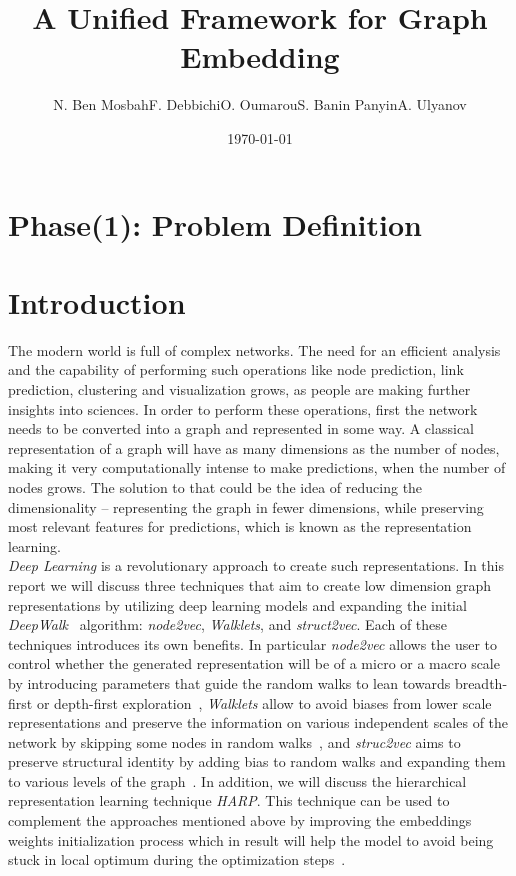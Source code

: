 \documentclass[a4paper,13pt]{article}
\title{A Unified Framework for Graph Embedding}
\author{N. Ben Mosbah\quad F. Debbichi\quad O. Oumarou\quad S. Banin Panyin\quad A. Ulyanov}
\date{\today}
\begin{document}
\maketitle
\section*{Phase(1): Problem Definition}

\section{Introduction}
The modern world is full of complex networks. The need for an efficient analysis and the capability of performing such operations like node prediction, link prediction, clustering and visualization grows, as people are making further insights into sciences. In order to perform these operations, first the network needs to be converted into a graph and represented in some way. A classical representation of a graph will have as many dimensions as the number of nodes, making it very computationally intense to make predictions, when the number of nodes grows. The solution to that could be the idea of reducing the dimensionality – representing the graph in fewer dimensions, while preserving most relevant features for predictions, which is known as the representation learning.\\
\textit{Deep Learning} is a revolutionary approach to create such representations. In this report we will discuss three techniques that aim to create low dimension graph representations by utilizing deep learning models and expanding the initial \textit{DeepWalk}~\cite{deepwalk} algorithm: \textit{node2vec}, \textit{Walklets}, and \textit{struct2vec}. Each of these techniques introduces its own benefits. In particular \textit{node2vec} allows the user to control whether the generated representation will be of a micro or a macro scale by introducing parameters that guide the random walks to lean towards breadth-first or depth-first exploration~\cite{node2vec}, \textit{Walklets} allow to avoid biases from lower scale representations and preserve the information on various independent scales of the network by skipping some nodes in random walks~\cite{walklets}, and \textit{struc2vec} aims to preserve structural identity by adding bias to random walks and expanding them to various levels of the graph~\cite{struc2vec}. In addition, we will discuss the hierarchical representation learning technique \textit{HARP}. This technique can be used to complement the approaches mentioned above by improving the embeddings weights initialization process which in result will help the model to avoid being stuck in local optimum during the optimization steps~\cite{harp}.
\end{document}
